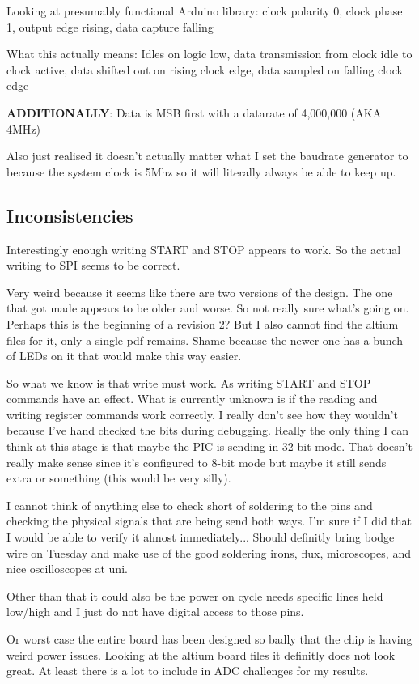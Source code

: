 Looking at presumably functional Arduino library:
clock polarity 0, clock phase 1, output edge rising, data capture falling

What this actually means:
Idles on logic low, data transmission from clock idle to clock active,
data shifted out on rising clock edge, data sampled on falling clock edge

\textbf{ADDITIONALLY}: Data is MSB first with a datarate of 4,000,000 (AKA 4MHz)

Also just realised it doesn't actually matter what I set the baudrate generator to because
the system clock is 5Mhz so it will literally always be able to keep up.


\subsection{Inconsistencies}
Interestingly enough writing START and STOP appears to work.
So the actual writing to SPI seems to be correct.

Very weird because it seems like there are two versions of the design.
The one that got made appears to be older and worse. So not really sure what's going on.
Perhaps this is the beginning of a revision 2?
But I also cannot find the altium files for it, only a single pdf remains.
Shame because the newer one has a bunch of LEDs on it that would make this way easier.

So what we know is that write must work. As writing START and STOP commands have
an effect.
What is currently unknown is if the reading and writing register commands work correctly.
I really don't see how they wouldn't because I've hand checked the bits during debugging.
Really the only thing I can think at this stage is that maybe the PIC is sending in 32-bit
mode. That doesn't really make sense since it's configured to 8-bit mode but maybe it
still sends extra or something (this would be very silly).

I cannot think of anything else to check short of soldering to the pins and checking
the physical signals that are being send both ways. I'm sure if I did that I would be able
to verify it almost immediately... Should definitly bring bodge wire on Tuesday and make
use of the good soldering irons, flux, microscopes, and nice oscilloscopes at uni.

Other than that it could also be the power on cycle needs specific lines held low/high
and I just do not have digital access to those pins.

Or worst case the entire board has been designed so badly that the chip is having weird
power issues. Looking at the altium board files it definitly does not look great.
At least there is a lot to include in ADC challenges for my results.



